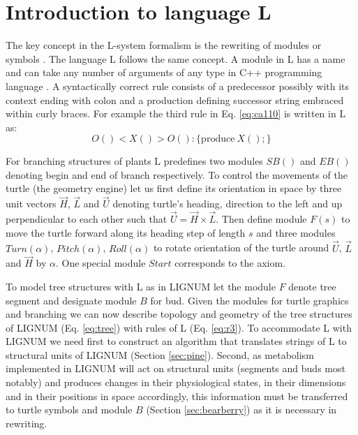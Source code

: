 \section{Introduction to language L}

The key concept in the  L-system formalism is the rewriting of modules
or symbols \citep{pp:89}.  The language  L follows the same concept. A
module in  L has a name  and can take  any number of arguments  of any
type   in   C++   programming   language   \citep{stroustrup:97}.    A
syntactically correct rule consists of a predecessor possibly with its
context ending  with colon and a production  defining successor string
embraced within curly braces.  For example the third rule in Eq.
\ref{eq:ca110} is written in L as:
\begin{equation}\label{eq:r3}
 O() < X() > O(): \{\mathrm{produce}\ X();\}
\end{equation}

For branching structures of plants L predefines two modules $SB()$ and
$EB()$ denoting begin and end  of branch respectively.  To control the
movements of the turtle (the  geometry engine) let us first define its
orientation  in space by  three unit  vectors $\vec  H$, $\vec  L$ and
$\vec  U$ denoting  turtle's heading,  direction  to the  left and  up
perpendicular to each other such that $\vec U = \vec H \times \vec L$.
Then define module $F(s)$ to move the turtle forward along its heading
step of length $s$  and three modules $Turn(\alpha)$, $Pitch(\alpha)$,
$Roll(\alpha)$ to  rotate orientation of  the turtle around  $\vec U$,
$\vec  L$  and $\vec  H$  by  $\alpha$.   One special  module  $Start$
corresponds to the axiom.

To model tree structures with L as in LIGNUM let the module $F$ denote
tree segment and designate module  $B$ for bud.  Given the modules for
turtle  graphics  and  branching  we  can now  describe  topology  and
geometry of  the tree structures  of LIGNUM (Eq.   \ref{eq:tree}) with
rules of  L (Eq.  \ref{eq:r3}). To  accommodate L with  LIGNUM we need
first  to construct  an  algorithm  that translates  strings  of L  to
structural  units  of  LIGNUM  (Section \ref{sec:pine}).   Second,  as
metabolism  implemented  in  LIGNUM   will  act  on  structural  units
(segments  and  buds  most  notably)  and produces  changes  in  their
physiological states,  in their dimensions  and in their  positions in
space  accordingly, this  information  must be  transferred to  turtle
symbols  and  module  $B$   (Section  \ref{sec:bearberry})  as  it  is
necessary in rewriting.

